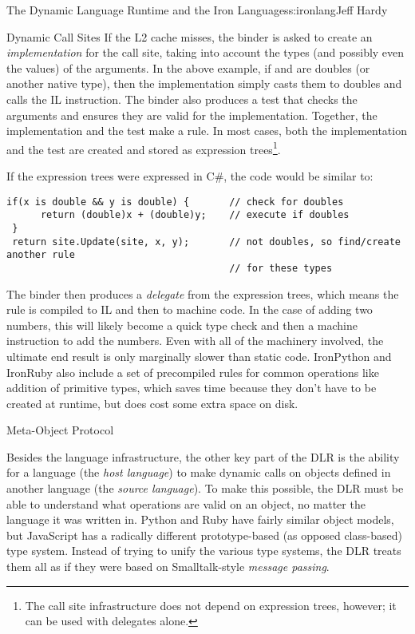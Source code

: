\begin{aosachapter}{The Dynamic Language Runtime and the Iron Languages}{s:ironlang}{Jeff Hardy}
\begin{aosasect1}{Dynamic Call Sites}
If the L2 cache misses, the binder is asked to create an \emph{implementation}
for the call site, taking into account the types (and possibly even the values)
of the arguments. In the above example, if  and  are doubles
(or another native type), then the implementation simply casts them to doubles
and calls the IL  instruction. The binder also produces a test that
checks the arguments and ensures they are valid for the implementation.
Together, the implementation and the test make a rule. In most cases, both the
implementation and the test are created and stored as expression
trees\footnote{The call site infrastructure does not depend on expression
trees, however; it can be used with delegates alone.}.

\newpage %

\noindent If the expression trees were expressed in C\#, the code would be similar to:

\begin{verbatim}
if(x is double && y is double) {       // check for doubles
      return (double)x + (double)y;    // execute if doubles
 }
 return site.Update(site, x, y);       // not doubles, so find/create another rule 
                                       // for these types
\end{verbatim}

The binder then produces a \emph{delegate} from the expression trees, which
means the rule is compiled to IL and then to machine code. In the case of
adding two numbers, this will likely become a quick type check and then a
machine instruction to add the numbers. Even with all of the machinery
involved, the ultimate end result is only marginally slower than static code.
IronPython and IronRuby also include a set of precompiled rules for common
operations like addition of primitive types, which saves time because they don't
have to be created at runtime, but does cost some extra space on disk.

\end{aosasect1}

\begin{aosasect1}{Meta-Object Protocol}

Besides the language infrastructure, the other key part of the DLR is the
ability for a language (the \emph{host language}) to make dynamic calls on
objects defined in another language (the \emph{source language}). To make this
possible, the DLR must be able to understand what operations are valid on an
object, no matter the language it was written in. Python and Ruby have fairly
similar object models, but JavaScript has a radically different prototype-based
(as opposed class-based) type system. Instead of trying to unify the various
type systems, the DLR treats them all as if they were based on Smalltalk-style
\emph{message passing}.


\end{aosasect1}
\end{aosachapter}
